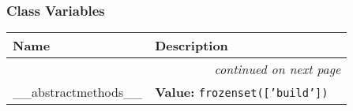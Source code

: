   \subsubsection{Class Variables}

    \vspace{-1cm}
\hspace{\varindent}\begin{longtable}{|p{\varnamewidth}|p{\vardescrwidth}|l}
\cline{1-2}
\cline{1-2} \centering \textbf{Name} & \centering \textbf{Description}& \\
\cline{1-2}
\endhead\cline{1-2}\multicolumn{3}{r}{\small\textit{continued on next page}}\\\endfoot\cline{1-2}
\endlastfoot\raggedright \_\-\_\-a\-b\-s\-t\-r\-a\-c\-t\-m\-e\-t\-h\-o\-d\-s\-\_\-\_\- & \raggedright \textbf{Value:} 
{\tt \texttt{frozenset([}\texttt{'}\texttt{build}\texttt{'}\texttt{])}}&\\
\cline{1-2}
\end{longtable}

